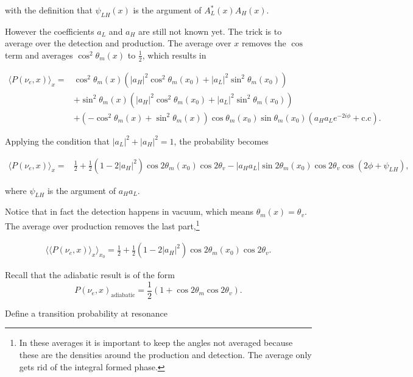 \documentclass{tufte-handout}
\begin{document}
with the definition that $\psi_{LH}(x)$ is the argument of $A_L^*(x)A_H(x)$.


However the coefficients $a_L$ and $a_H$ are still not known yet. The trick is to average over the detection and production. The average over $x$ removes the $\cos$ term and averages $\cos^2\theta_m(x)$ to $\frac{1}{2}$, which results in


\begin{align*}
\langle P(\nu_e,x)\rangle_{x} =& \cos^2\theta_m(x) (\lvert a_H\rvert^2 \cos^2\theta_m(x_0) + \lvert a_L\rvert^2 \sin^2\theta_m(x_0) ) \\
& + \sin^2\theta_m(x) ( \lvert a_H\rvert^2 \cos^2\theta_m(x_0) + \lvert a_L \rvert^2 \sin^2\theta_m(x_0) ) \\
& + ( - \cos^2\theta_m(x) + \sin^2\theta_m(x) ) \cos\theta_m(x_0)\sin\theta_m(x_0) ( a_H a_L e^{-2i\phi} + \mathrm{c.c}) .
\end{align*}

Applying the condition that $\lvert a_L \rvert^2 + \lvert a_H \rvert^2 = 1$, the probability becomes

\begin{align*}
\langle P(\nu_e,x)\rangle_{x} =& \frac{1}{2} + \frac{1}{2} (1 - 2 \lvert a_H \rvert^2) \cos 2\theta_m(x_0) \cos 2\theta_v - \lvert a_H a_L \rvert \sin 2\theta_m(x_0)\cos 2\theta_v \cos ( 2 \phi + \psi_{LH} ),
\end{align*}

where $\psi_{LH}$ is the argument of $a_H a_L$.

Notice that in fact the detection happens in vacuum, which means $\theta_m(x)=\theta_v$. The average over production removes the last part,\footnote{In these averages it is important to keep the angles not averaged because these are the densities around the production and detection. The average only gets rid of the integral formed phase.}

\begin{align*}
 \langle \langle P(\nu_e,x)\rangle_{x} \rangle_{x_0}= \frac{1}{2} + \frac{1}{2}(1- 2\lvert a_H \rvert^2) \cos 2\theta_m(x_0) \cos 2\theta_v .
\end{align*}


{\color{red}Recall that the adiabatic result is of the form
\begin{equation*}
P(\nu_e,x)_{\mathrm{adiabatic}} = \frac{1}{2} ( 1+ \cos 2\theta_m \cos 2\theta_v ).
\end{equation*}}


Define a transition probability at resonance
\end{document}
